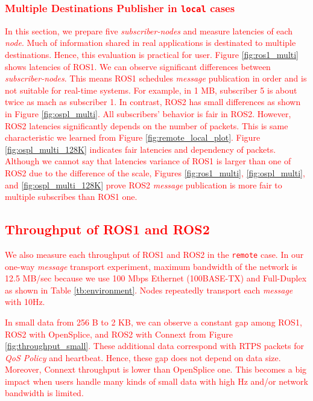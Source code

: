 \documentclass{sig-alternate-05-2015}
\begin{document}
\vspace{-2mm}
\subsubsection{\textcolor{red}{Multiple Destinations Publisher in \texttt{local} cases}}
\label{sec:multiple}
\textcolor{red}{
In this section, we prepare five \emph{subscriber-nodes} and measure latencies of each \emph{node}.
Much of information shared in real applications is destinated to multiple destinations.
Hence, this evaluation is practical for user.
Figure \ref{fig:ros1_multi} shows latencies of ROS1.
We can observe significant differences between \emph{subscriber-nodes}.
This means ROS1 schedules \emph{message} publication in order and is not suitable for real-time systems.
For example, in 1 MB, subscriber 5 is about twice as mach as subscriber 1.
In contrast, ROS2 has small differences as shown in Figure \ref{fig:ospl_multi}.
All subscribers' behavior is fair in ROS2.
However, ROS2 latencies significantly depends on the number of packets.
This is same characteristic we learned from Figure \ref{fig:remote_local_plot}.
Figure \ref{fig:ospl_multi_128K} indicates fair latencies and dependency of packets.
Although we cannot say that latencies variance of ROS1 is larger than one of ROS2 due to the difference of the scale, Figures \ref{fig:ros1_multi}, \ref{fig:ospl_multi}, and \ref{fig:ospl_multi_128K} prove ROS2 \emph{message} publication is more fair to multiple subscribes than ROS1 one.
}

\vspace{-2mm}
\subsection{\textcolor{red}{Throughput of ROS1 and ROS2}}
\label{sec:throughput}
\textcolor{red}{
We also measure each throughput of ROS1 and ROS2 in the \texttt{remote} case.
In our one-way \emph{message} transport experiment, maximum bandwidth of the network is 12.5 MB/sec because we use 100 Mbps Ethernet (100BASE-TX) and Full-Duplex as shown in Table \ref{tb:environment}.
Nodes repeatedly transport each \emph{message} with 10Hz.
}

\textcolor{red}{
In small data from 256 B to 2 KB, we can observe a constant gap among ROS1, ROS2 with OpenSplice, and ROS2 with Connext from Figure \ref{fig:throughput_small}.
These additional data correspond with RTPS packets for \emph{QoS Policy} and heartbeat.
Hence, these gap does not depend on data size.
Moreover, Connext throughput is lower than OpenSplice one.
This becomes a big impact when users handle many kinds of small data with high Hz and/or network bandwidth is limited.
}
\end{document}
